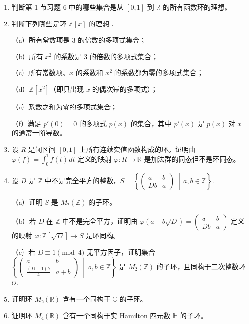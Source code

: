 \begin{enumerate}
\item 判断第 1 节习题 6 中的哪些集合是从 \([0,1]\) 到 \(\mathbb{R}\) 的所有函数环的理想。

\item 判断下列哪些是环 \(\mathbb{Z}[x]\) 的理想：

（a）所有常数项是 3 的倍数的多项式集合；

（b）所有 \(x^2\) 的系数是 3 的倍数的多项式集合；

（c）所有常数项、\(x\) 的系数和 \(x^2\) 的系数都为零的多项式集合；

（d）\(\mathbb{Z}[x^2]\)（即只出现 \(x\) 的偶次幂的多项式）；

（e）系数之和为零的多项式集合；

（f）满足 \(p'(0) = 0\) 的多项式 \(p(x)\) 的集合，其中 \(p'(x)\) 是 \(p(x)\) 对 \(x\) 的通常一阶导数。

\item 设 \(R\) 是闭区间 \([0,1]\) 上所有连续实值函数构成的环。证明由 \(\varphi(f) = \int_0^1 f(t)\,dt\) 定义的映射 \(\varphi : R \to \mathbb{R}\) 是加法群的同态但不是环同态。

\item 设 \(D\) 是 \(\mathbb{Z}\) 中不是完全平方的整数，\(S = \left\{\begin{pmatrix} a & b \\ Db & a \end{pmatrix} \ \middle|\ a, b \in \mathbb{Z}\right\}\).

（a）证明 \(S\) 是 \(M_2(\mathbb{Z})\) 的子环。

（b）若 \(D\) 在 \(\mathbb{Z}\) 中不是完全平方，证明由 \(\varphi(a + b\sqrt{D}) = \begin{pmatrix} a & b \\ Db & a \end{pmatrix}\) 定义的映射 \(\varphi : \mathbb{Z}[\sqrt{D}] \to S\) 是环同构。

（c）若 \(D \equiv 1 \pmod 4\) 无平方因子，证明集合 \(\left\{\begin{pmatrix} a & b \\ \frac{(D-1)b}{4} & a+b \end{pmatrix} \ \middle|\ a, b \in \mathbb{Z}\right\}\) 是 \(M_2(\mathbb{Z})\) 的子环，且同构于二次整数环 \(\mathcal{O}\).

\item 证明环 \(M_2(\mathbb{R})\) 含有一个同构于 \(\mathbb{C}\) 的子环。

\item 证明环 \(M_4(\mathbb{R})\) 含有一个同构于实 Hamilton 四元数 \(\mathbb{H}\) 的子环。


\end{enumerate}
